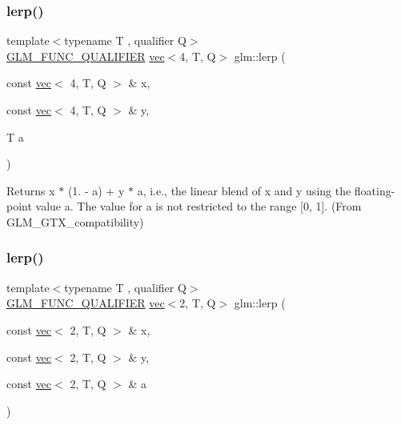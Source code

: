 \subsubsection{\texorpdfstring{lerp()}{lerp()}\hspace{0.1cm}{\footnotesize\ttfamily [4/7]}}
{\footnotesize\ttfamily template$<$typename T , qualifier Q$>$ \\
\mbox{\hyperlink{setup_8hpp_a33fdea6f91c5f834105f7415e2a64407}{G\+L\+M\+\_\+\+F\+U\+N\+C\+\_\+\+Q\+U\+A\+L\+I\+F\+I\+ER}} \mbox{\hyperlink{structglm_1_1vec}{vec}}$<$4, T, Q$>$ glm\+::lerp (\begin{DoxyParamCaption}\item[{const \mbox{\hyperlink{structglm_1_1vec}{vec}}$<$ 4, T, Q $>$ \&}]{x,  }\item[{const \mbox{\hyperlink{structglm_1_1vec}{vec}}$<$ 4, T, Q $>$ \&}]{y,  }\item[{T}]{a }\end{DoxyParamCaption})}



Returns x $\ast$ (1. -\/ a) + y $\ast$ a, i.\+e., the linear blend of x and y using the floating-\/point value a. The value for a is not restricted to the range \mbox{[}0, 1\mbox{]}. (From G\+L\+M\+\_\+\+G\+T\+X\+\_\+compatibility) 

\mbox{\label{group__gtx__compatibility_gaf68de5baf72d16135368b8ef4f841604}} 
\subsubsection{\texorpdfstring{lerp()}{lerp()}\hspace{0.1cm}{\footnotesize\ttfamily [5/7]}}
{\footnotesize\ttfamily template$<$typename T , qualifier Q$>$ \\
\mbox{\hyperlink{setup_8hpp_a33fdea6f91c5f834105f7415e2a64407}{G\+L\+M\+\_\+\+F\+U\+N\+C\+\_\+\+Q\+U\+A\+L\+I\+F\+I\+ER}} \mbox{\hyperlink{structglm_1_1vec}{vec}}$<$2, T, Q$>$ glm\+::lerp (\begin{DoxyParamCaption}\item[{const \mbox{\hyperlink{structglm_1_1vec}{vec}}$<$ 2, T, Q $>$ \&}]{x,  }\item[{const \mbox{\hyperlink{structglm_1_1vec}{vec}}$<$ 2, T, Q $>$ \&}]{y,  }\item[{const \mbox{\hyperlink{structglm_1_1vec}{vec}}$<$ 2, T, Q $>$ \&}]{a }\end{DoxyParamCaption})}



